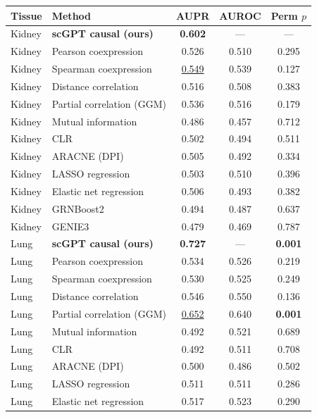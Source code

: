 \documentclass[11pt,letterpaper]{article}
\begin{document}
\medskip
\noindent\begin{tabular}{llccc}
\toprule
\textbf{Tissue} & \textbf{Method} & \textbf{AUPR} & \textbf{AUROC} & \textbf{Perm $p$} \\
\midrule
Kidney & \textbf{scGPT causal (ours)}     & \textbf{0.602} & ---   & ---   \\
Kidney & Pearson coexpression             & 0.526 & 0.510 & 0.295 \\
Kidney & Spearman coexpression            & \underline{0.549} & 0.539 & 0.127 \\
Kidney & Distance correlation             & 0.516 & 0.508 & 0.383 \\
Kidney & Partial correlation (GGM)        & 0.536 & 0.516 & 0.179 \\
Kidney & Mutual information               & 0.486 & 0.457 & 0.712 \\
Kidney & CLR                              & 0.502 & 0.494 & 0.511 \\
Kidney & ARACNE (DPI)                     & 0.505 & 0.492 & 0.334 \\
Kidney & LASSO regression                 & 0.503 & 0.510 & 0.396 \\
Kidney & Elastic net regression           & 0.506 & 0.493 & 0.382 \\
Kidney & GRNBoost2                        & 0.494 & 0.487 & 0.637 \\
Kidney & GENIE3                           & 0.479 & 0.469 & 0.787 \\
\midrule
Lung   & \textbf{scGPT causal (ours)}     & \textbf{0.727} & ---   & \textbf{0.001} \\
Lung   & Pearson coexpression             & 0.534 & 0.526 & 0.219 \\
Lung   & Spearman coexpression            & 0.530 & 0.525 & 0.249 \\
Lung   & Distance correlation             & 0.546 & 0.550 & 0.136 \\
Lung   & Partial correlation (GGM)        & \underline{0.652} & 0.640 & \textbf{0.001} \\
Lung   & Mutual information               & 0.492 & 0.521 & 0.689 \\
Lung   & CLR                              & 0.492 & 0.511 & 0.708 \\
Lung   & ARACNE (DPI)                     & 0.500 & 0.486 & 0.502 \\
Lung   & LASSO regression                 & 0.511 & 0.511 & 0.286 \\
Lung   & Elastic net regression           & 0.517 & 0.523 & 0.290 \\

\end{tabular}
\end{document}
